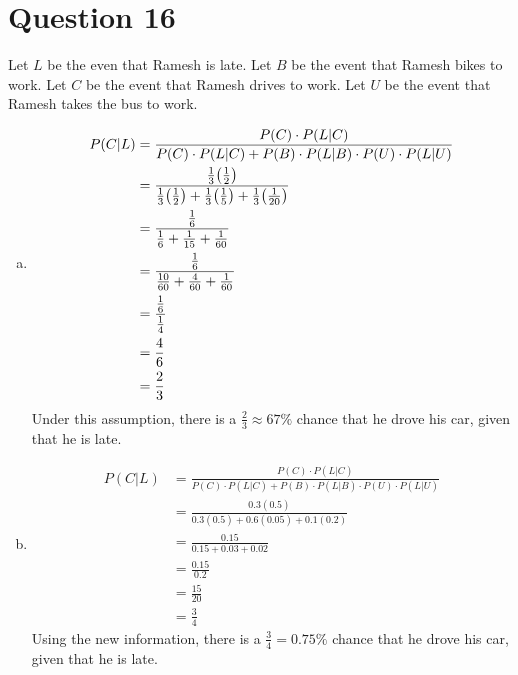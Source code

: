 \documentclass[article, 12pt]{article}
\title{\hwTitle}
\author{\name}
\date{%
    Due: \hwDueDate
}
\DeclarePairedDelimiter\paren{(}{)} %
\begin{document}
\section*{Question 16}
Let $L$ be the even that Ramesh is late. Let $B$ be the event that Ramesh bikes to work. Let $C$ be the event that Ramesh drives to work. Let $U$ be the event that Ramesh takes the bus to work. 
\begin{enumerate}[a)]
    \item
    \begin{align*}
        P(C|L) &= \frac{P(C) \cdot P(L|C)}{P(C) \cdot P(L|C) + P(B) \cdot P(L|B) \cdot P(U) \cdot P(L|U)} \\
               &= \frac{\frac{1}{3}\paren*{\frac{1}{2}}}{\frac{1}{3}\paren*{\frac{1}{2}} + \frac{1}{3}\paren*{\frac{1}{5}} + \frac{1}{3}\paren*{\frac{1}{20}}} \\
               &= \frac{\frac{1}{6}}{\frac{1}{6} + \frac{1}{15} + \frac{1}{60}} \\
               &= \frac{\frac{1}{6}}{\frac{10}{60} + \frac{4}{60} + \frac{1}{60}} \\
               &= \frac{\frac{1}{6}}{\frac{1}{4}} \\
               &= \frac{4}{6} \\
               &= \frac{2}{3}
    \end{align*}
    Under this assumption, there is a $\frac{2}{3} \approx 67\%$ chance that he drove his car, given that he is late.
    \item 
    \begin{align*}
        P(C|L) &= \frac{P(C) \cdot P(L|C)}{P(C) \cdot P(L|C) + P(B) \cdot P(L|B) \cdot P(U) \cdot P(L|U)} \\
               &= \frac{0.3(0.5)}{0.3(0.5) + 0.6(0.05) + 0.1(0.2)} \\
               &= \frac{0.15}{0.15 + 0.03 + 0.02} \\
               &= \frac{0.15}{0.2} \\
               &= \frac{15}{20} \\
               &= \frac{3}{4}
    \end{align*}
    Using the new information, there is a $\frac{3}{4} = 0.75\%$ chance that he drove his car, given that he is late.
\end{enumerate}
\end{document}
